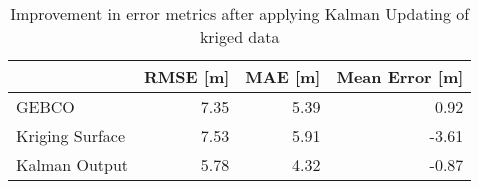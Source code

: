 \begin{table}
\centering
\caption{Improvement in error metrics after applying Kalman Updating of kriged data}
\label{tab:charlotteamalie_gebco_raster_error}
\begin{tabular}{lrrr}
\toprule
 & RMSE [m] & MAE [m] & Mean Error [m] \\
\midrule
GEBCO & 7.35 & 5.39 & 0.92 \\
Kriging Surface & 7.53 & 5.91 & -3.61 \\
Kalman Output & 5.78 & 4.32 & -0.87 \\
\bottomrule
\end{tabular}
\end{table}
